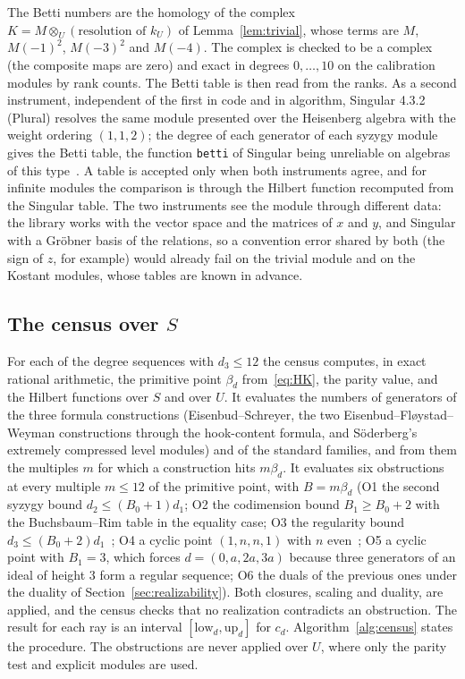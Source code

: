 \documentclass[11pt]{article}
\theoremstyle{definition}
\theoremstyle{remark}
\begin{document}
The Betti numbers are the homology of the complex $K=M\otimes_U(\text{resolution of }k_U)$ of Lemma~\ref{lem:trivial}, whose terms are $M$, $M(-1)^2$, $M(-3)^2$ and $M(-4)$. The complex is checked to be a complex (the composite maps are zero) and exact in degrees $0,\dots,10$ on the calibration modules by rank counts. The Betti table is then read from the ranks. As a second instrument, independent of the first in code and in algorithm, Singular 4.3.2 (Plural) resolves the same module presented over the Heisenberg algebra with the weight ordering $(1,1,2)$; the degree of each generator of each syzygy module gives the Betti table, the function \texttt{betti} of Singular being unreliable on algebras of this type~\cite{Singular}. A table is accepted only when both instruments agree, and for infinite modules the comparison is through the Hilbert function recomputed from the Singular table. The two instruments see the module through different data: the library works with the vector space and the matrices of $x$ and $y$, and Singular with a Gr\"obner basis of the relations, so a convention error shared by both (the sign of $z$, for example) would already fail on the trivial module and on the Kostant modules, whose tables are known in advance.

\subsection{The census over \texorpdfstring{$S$}{S}}
\label{sec:census}

For each of the \nrays{} degree sequences with $d_3\le12$ the census computes, in exact rational arithmetic, the primitive point $\beta_d$ from~\eqref{eq:HK}, the parity value, and the Hilbert functions over $S$ and over $U$. It evaluates the numbers of generators of the three formula constructions (Eisenbud--Schreyer, the two Eisenbud--Fl{\o}ystad--Weyman constructions through the hook-content formula, and S\"oderberg's extremely compressed level modules) and of the standard families, and from them the multiples $m$ for which a construction hits $m\beta_d$. It evaluates six obstructions at every multiple $m\le12$ of the primitive point, with $B=m\beta_d$ (O1 the second syzygy bound $d_2\le(B_0+1)d_1$; O2 the codimension bound $B_1\ge B_0+2$ with the Buchsbaum--Rim table in the equality case; O3 the regularity bound $d_3\le(B_0+2)d_1$~\cite[Proposition~3.1]{Erman09}; O4 a cyclic point $(1,n,n,1)$ with $n$ even~\cite{BE77}; O5 a cyclic point with $B_1=3$, which forces $d=(0,a,2a,3a)$ because three generators of an ideal of height $3$ form a regular sequence; O6 the duals of the previous ones under the duality of Section~\ref{sec:realizability}). Both closures, scaling and duality, are applied, and the census checks that no realization contradicts an obstruction. The result for each ray is an interval $[\mathrm{low}_d,\mathrm{up}_d]$ for $c_d$. Algorithm~\ref{alg:census} states the procedure. The obstructions are never applied over $U$, where only the parity test and explicit modules are used.
\end{document}
